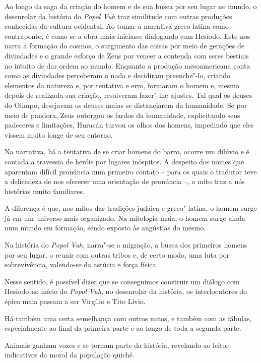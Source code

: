 \documentclass[11pt]{extarticle}
\begin{document}
Ao longo da saga da criação do homem e de sua busca por seu lugar no
mundo, o desenrolar da história do \textit{Popol Vuh} traz similitude com outras
produções conhecidas da cultura ocidental. Ao tomar a narrativa
greco-latina como contraponto, é como se a obra maia iniciasse
dialogando com Hesíodo. Este nos narra a formação do cosmos, o
surgimento das coisas por meio de gerações de divindades e o grande
esforço de Zeus por vencer a contenda com seres bestiais no intuito de
dar ordem ao mundo. Enquanto a produção mesoamericana conta como as
divindades perceberam o nada e decidiram preenche"-lo, criando elementos
da natureza e, por tentativa e erro, formaram o homem e, mesmo depois de
realizada sua criação, resolveram fazer"-lhe ajustes. Tal qual os deuses
do Olimpo, desejavam os deuses maias se distanciarem da humanidade. Se
por meio de pandora, Zeus outorgou os fardos da humanidade, explicitando
seus padeceres e limitações, Huracán turvou os olhos dos homens,
impedindo que eles vissem muito longe de seu entorno.




Na narrativa, há a tentativa de se criar homens do barro, ocorre um
dilúvio e é contada a travessia de heróis por lugares inóspitos. A
despeito dos nomes que aparentam difícil pronúncia num primeiro contato
-- para os quais o tradutor teve a delicadeza de nos oferecer uma
orientação de pronúncia --, o mito traz a nós histórias muito
familiares.

A diferença é que, nos mitos das tradições judaica e greco"-latina, o
homem surge já em um universo mais organizado. Na mitologia maia, o
homem surge ainda num mundo em formação, sendo exposto às angústias do
mesmo.

Na história do \textit{Popol Vuh}, narra"-se a migração, a busca dos primeiros
homens por seu lugar, o reunir com outras tribos e, de certo modo, uma
luta por sobrevivência, valendo-se da astúcia e força física.

Nesse sentido, é possível dizer que se conseguimos construir um diálogo
com Hesíodo no início do \textit{Popol Vuh}, no desenrolar da história, os
interlocutores do épico maia passam a ser Virgílio e Tito Lívio.

Há também uma certa semelhança com outros mitos, e também com as
fábulas, especialmente ao final da primeira parte e ao longo de toda a
segunda parte.

Animais ganham vozes e se tornam parte da história, revelando ao leitor
indicativos da moral da população quiché.
\end{document}
